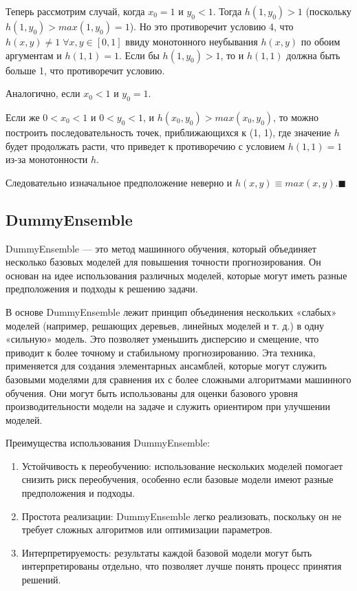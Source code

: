 Теперь рассмотрим случай, когда $x_0 = 1$ и $y_0 < 1$.  Тогда $h(1, y_0) > 1$  (поскольку $h(1,y_0) > max(1, y_0) = 1$). Но это противоречит условию 4, что $h(x,y) \neq 1 \; \forall x, y \in [0, 1]$ ввиду монотонного неубывания $h(x,y)$ по обоим аргументам и $h(1,1) = 1$.  Если бы $h(1, y_0) > 1$, то и $h(1,1)$ должна быть больше 1, что противоречит условию.

Аналогично, если  $x_0 < 1$ и $y_0 = 1$.

Если же $0 < x_0 < 1$ и $0 < y_0 < 1$, и  $h(x_0, y_0) > max(x_0, y_0)$, то можно построить последовательность точек, приближающихся к (1, 1),  где значение $h$ будет продолжать расти, что приведет к противоречию с условием $h(1, 1) = 1$ из-за монотонности $h$.

Следовательно изначальное предположение неверно и $h(x,y)\equiv max(x,y).\blacksquare$

\subsection{DummyEnsemble}
DummyEnsemble — это метод машинного обучения, который объединяет несколько базовых моделей для повышения точности прогнозирования. Он основан на идее использования различных моделей, которые могут иметь разные предположения и подходы к решению задачи.

В основе DummyEnsemble лежит принцип объединения нескольких «слабых» моделей (например, решающих деревьев, линейных моделей и т. д.) в одну «сильную» модель. Это позволяет уменьшить дисперсию и смещение, что приводит к более точному и стабильному прогнозированию. Эта техника, применяется для создания элементарных ансамблей, которые могут служить базовыми моделями для сравнения их с более сложными алгоритмами машинного обучения. Они могут быть использованы для оценки базового уровня производительности модели на задаче и служить ориентиром при улучшении моделей.

Преимущества использования DummyEnsemble:
\begin{enumerate}
    \item Устойчивость к переобучению: использование нескольких моделей помогает снизить риск переобучения, особенно если базовые модели имеют разные предположения и подходы.
    \item Простота реализации: DummyEnsemble легко реализовать, поскольку он не требует сложных алгоритмов или оптимизации параметров.
    \item Интерпретируемость: результаты каждой базовой модели могут быть интерпретированы отдельно, что позволяет лучше понять процесс принятия решений.
\end{enumerate}


